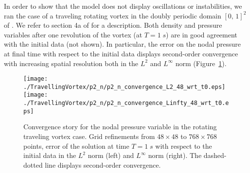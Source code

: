 \documentclass{ametsoc}
\newcommand{\sblue}[1]{\textcolor{sblue}{#1}}
\newcommand{\revision}[1]{\sblue{#1}}
\theoremstyle{definition}
\begin{document}
\begin{appendix}[B]\label{sec: appB}%

\revision{In order to show that the model does not display oscillations or instabilities, we ran the case of a traveling rotating vortex in the doubly periodic domain $[0,\,1]^2$ of \cite{KadiogluEtAl2008}. We refer to section 4a of \cite{BenacchioEtAl2014} for a description. Both density and pressure variables after one revolution of the vortex (at $T=1\;s$) are in good agreement with the initial data (not shown). In particular, the error on the nodal pressure at final time with respect to the initial data displays second-order convergence with increasing spatial resolution both in the $L^2$ and $L^\infty$ norm (Figure~\ref{fig:pressure_convergence}).}
\begin{figure}
 \texttt{[image: ./TravellingVortex/p2\_n/p2\_n\_convergence\_L2\_48\_wrt\_t0.eps]}
 \texttt{[image: ./TravellingVortex/p2\_n/p2\_n\_convergence\_Linfty\_48\_wrt\_t0.eps]}
\caption{Convergence story for the nodal pressure variable in the rotating traveling vortex case. Grid refinements from $48\times48$ to $768\times768$ points, error of the solution at time $T=1\;s$ with respect to the initial data in the $L^2$ norm (left) and $L^\infty$ norm (right). The dashed-dotted line displays second-order convergence.}
\label{fig:pressure_convergence}
\end{figure}
\end{appendix}
\end{document}
